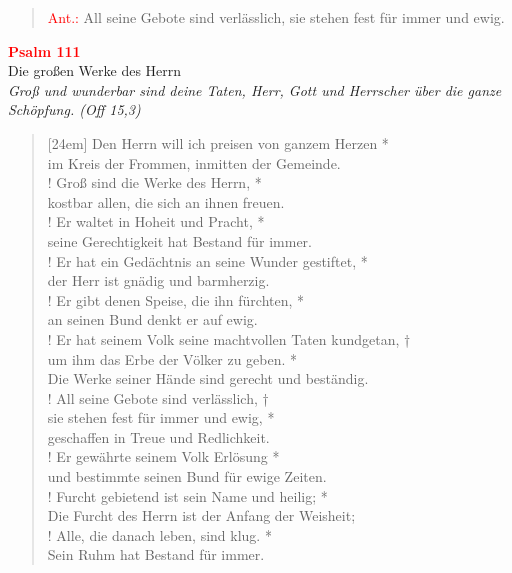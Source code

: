 \vspace*{4cm}

\begin{verse}
 \textcolor{red}{Ant.:} All seine Gebote sind verlässlich, sie stehen fest für immer und ewig.
 \end{verse}
 

\vspace*{0.5cm}

\begin{center}
 \textcolor{red}{\large \bf Psalm 111}\\
Die großen Werke des Herrn\\
\textit{\small Groß und wunderbar sind deine Taten, Herr, Gott und Herrscher über die ganze Schöpfung. (Off 15,3)}
\end{center}
\begin{verse}[24em]
Den Herrn will ich preisen von ganzem Herzen *\\
im Kreis der Frommen, inmitten der Gemeinde. \\!
\vin	Groß sind die Werke des Herrn, *\\
\vin  kostbar allen, die sich an ihnen freuen.\\!
Er waltet in Hoheit und Pracht, *\\
seine Gerechtigkeit hat Bestand für immer.\\!
\vin  Er hat ein Gedächtnis an seine Wunder gestiftet, *\\
\vin  der Herr ist gnädig und barmherzig.\\!
Er gibt denen Speise, die ihn fürchten,  *\\
an seinen Bund denkt er auf ewig.\\!
\vin  Er hat seinem Volk \verselinebreak seine machtvollen Taten kundgetan, †\\
\vin  um ihm das Erbe der Völker zu geben. *\\
\vin  Die Werke seiner Hände sind gerecht und beständig.\\!
All seine Gebote sind verlässlich, †\\
sie stehen fest für immer und ewig, *\\
geschaffen in Treue und Redlichkeit.\\!
\vin  Er gewährte seinem Volk Erlösung  *\\
\vin  und bestimmte seinen Bund für ewige Zeiten.\\!
Furcht gebietend ist sein Name und heilig; *\\
Die Furcht des Herrn ist der Anfang der Weisheit;\\!
\vin  Alle, die danach leben, sind klug. *\\
\vin  Sein Ruhm hat Bestand für immer.\\
\end{verse}
\vspace{1cm}
